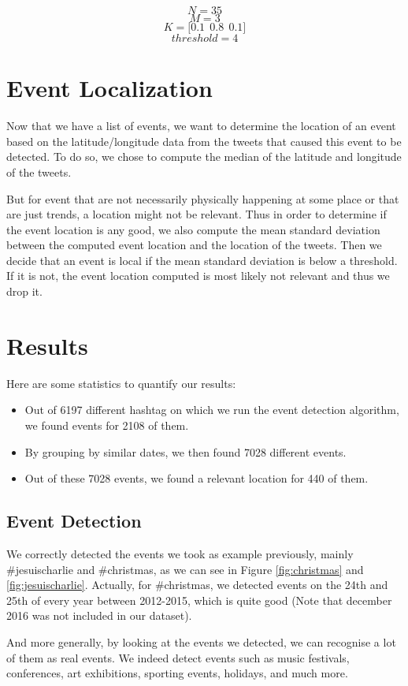 \documentclass[11pt]{article}
\begin{document}
$$N = 35 $$
$$M = 3$$
$$K = \big[ 0.1\ \ 0.8\ \ 0.1 \big]$$
$$threshold = 4$$

\section{Event Localization}
Now that we have a list of events, we want to determine the location of an event based on the latitude/longitude data from the tweets that caused this event to be detected. To do so, we chose to compute the median of the latitude and longitude of the tweets. 

But for event that are not necessarily physically happening at some place or that are just trends, a location might not be relevant. Thus in order to determine if the event location is any good, we also compute the mean standard deviation between the computed event location and the location of the tweets. Then we decide that an event is local if the mean standard deviation is below a threshold. If it is not, the event location computed is most likely not relevant and thus we drop it.

\section{Results}
Here are some statistics to quantify our results:

\begin{itemize}
  \item Out of 6197 different hashtag on which we run the event detection algorithm, we found events for 2108 of them.
  \item By grouping by similar dates, we then found 7028 different events.
  \item Out of these 7028 events, we found a relevant location for 440 of them.
\end{itemize}

\subsection{Event Detection}
We correctly detected the events we took as example previously, mainly \#jesuischarlie and \#christmas, as we can see in Figure \ref{fig:christmas} and \ref{fig:jesuischarlie}. Actually, for \#christmas, we detected events on the 24th and 25th of every year between 2012-2015, which is quite good (Note that december 2016 was not included in our dataset).

And more generally, by looking at the events we detected, we can recognise a lot of them as real events. We indeed detect events such as music festivals, conferences, art exhibitions, sporting events, holidays, and much more.
\end{document}
